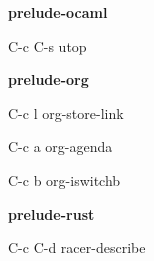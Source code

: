 \documentclass[10pt]{article}
\renewcommand\subsection[1]{\smallskip\par\textbf{\color{heading}#1}}
\renewcommand\subsection[1]{\smallskip\par\textbf{\color{heading}#1}}
\begin{document}
\begin{multicols}{4}
  \subsection{prelude-ocaml}
  \begin{keylist}
  \item[C-c C-s] utop
  \end{keylist}

  \subsection{prelude-org}
  \begin{keylist}
  \item[C-c l] org-store-link
  \item[C-c a] org-agenda
  \item[C-c b] org-iswitchb
  \end{keylist}

  \subsection{prelude-rust}
  \begin{keylist}
  \item[C-c C-d] racer-describe
  \end{keylist}

\end{multicols}
\end{document}

